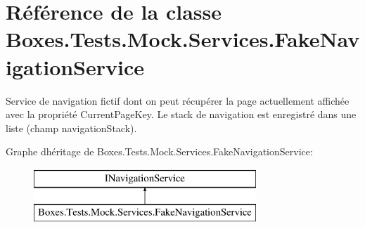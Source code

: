 \hypertarget{class_boxes_1_1_tests_1_1_mock_1_1_services_1_1_fake_navigation_service}{}\section{Référence de la classe Boxes.\+Tests.\+Mock.\+Services.\+Fake\+Navigation\+Service}
\label{class_boxes_1_1_tests_1_1_mock_1_1_services_1_1_fake_navigation_service}


Service de navigation fictif dont on peut récupérer la page actuellement affichée avec la propriété {\ttfamily Current\+Page\+Key}. Le stack de navigation est enregistré dans une liste (champ {\ttfamily navigation\+Stack}).  


Graphe d\textquotesingle{}héritage de Boxes.\+Tests.\+Mock.\+Services.\+Fake\+Navigation\+Service\+:\begin{figure}[H]
\begin{center}
\leavevmode
\includegraphics[height=2.000000cm]{class_boxes_1_1_tests_1_1_mock_1_1_services_1_1_fake_navigation_service}
\end{center}
\end{figure}
